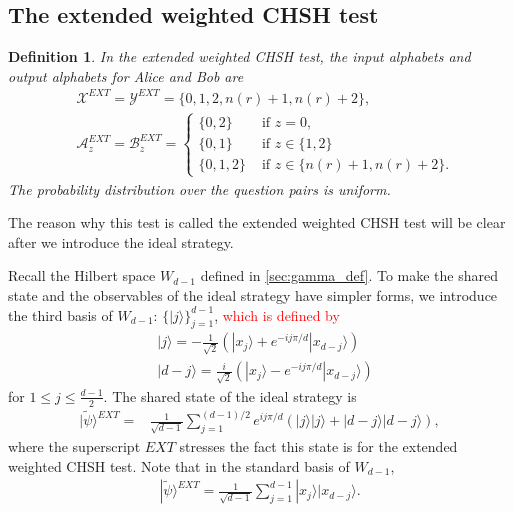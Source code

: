 \documentclass[11pt,letterpaper]{article}
\newcommand{\ket}[1]{|#1\rangle}
\newcommand{\calX}{\mathcal{X}}
\newcommand{\calY}{\mathcal{Y}}
\newcommand{\calA}{\mathcal{A}}
\newcommand{\calB}{\mathcal{B}}
\newcommand{\1}{\mathbb{1}}
\newcommand{\EXT}{EXT}
\newcommand{\tpsi}{\tilde{\psi}}
\newcommand{\nr}{n(r)}
\newcommand{\hf}[1]{\textcolor{red}{#1}}
\newtheorem{definition}[theorem]{Definition}
\theoremstyle{definition}
\begin{document}
\subsection{The extended weighted CHSH test}
\label{sec:ext_w_chsh}
\begin{definition}
    \label{def:ext_w_chsh}
    In the extended weighted CHSH test, the input alphabets and output alphabets for Alice and Bob are
    \begin{align*}
        &\calX^{\EXT} = \calY^{\EXT} = \{0, 1, 2, \nr+1, \nr+2\}, \\
        &\calA_z^{\EXT} = \calB_z^{\EXT} =
        \begin{cases}
            \{0,2\} &\text{ if } z = 0, \\
            \{0,1\} &\text{ if } z \in \{1, 2\} \\
            \{0,1,2\} &\text{ if } z \in \{\nr+1, \nr+2\}. 
        \end{cases}
    \end{align*}
    The probability distribution over the question pairs is uniform.
\end{definition}
The reason why this test is called the extended weighted CHSH test will be clear 
after we introduce the ideal strategy.

Recall the Hilbert space $W_{d-1}$ defined in \cref{sec:gamma_def}. 
To make the shared state and the observables of the ideal strategy have
simpler forms, we introduce the third basis of $W_{d-1}$: $\{ \ket{j} \}_{j=1}^{d-1}$, \hf{which is defined by}
\begin{align*}
    &\ket{j} = -\frac{1}{\sqrt{2}}(\ket{x_j} + e^{-ij\pi/d}\ket{x_{d-j}}) \\
    &\ket{d-j} = \frac{i}{\sqrt{2}}(\ket{x_j} - e^{-ij\pi/d}\ket{x_{d-j}})
\end{align*}
for $1 \leq j \leq \frac{d-1}{2}$.
The shared state of the ideal strategy is 
\begin{equation}
    \label{eq:tpsi}
    \begin{aligned}
        \ket{\tpsi}^{\EXT}
         =& \frac{1}{\sqrt{d-1}} \sum_{j=1}^{(d-1)/2} e^{ij\pi/d}(\ket{j}\ket{j} + \ket{d-j}\ket{d-j}),
    \end{aligned}
\end{equation}
where the superscript $\EXT$ stresses the fact this state is for the extended weighted CHSH test.
Note that in the standard basis of $W_{d-1}$,
\begin{align*}
    \ket{\tpsi}^{\EXT} = \frac{1}{\sqrt{d-1}} \sum_{j=1}^{d-1} \ket{x_j}\ket{x_{d-j}}.
\end{align*}
\end{document}
